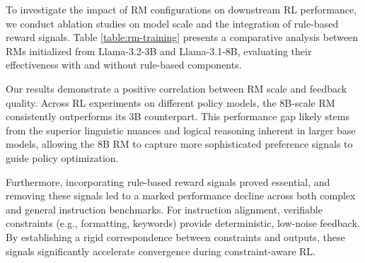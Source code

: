 To investigate the impact of RM configurations on downstream RL performance, we conduct ablation studies on model scale and the integration of rule-based reward signals. Table \ref{table:rm-training} presents a comparative analysis between RMs initialized from Llama-3.2-3B and Llama-3.1-8B, evaluating their effectiveness with and without rule-based components.

Our results demonstrate a positive correlation between RM scale and feedback quality. Across RL experiments on different policy models, the 8B-scale RM consistently outperforms its 3B counterpart. This performance gap likely stems from the superior linguistic nuances and logical reasoning inherent in larger base models, allowing the 8B RM to capture more sophisticated preference signals to guide policy optimization.

Furthermore, incorporating rule-based reward signals proved essential, and removing these signals led to a marked performance decline across both complex and general instruction benchmarks. For instruction alignment, verifiable constraints (e.g., formatting, keywords) provide deterministic, low-noise feedback. By establishing a rigid correspondence between constraints and outputs, these signals significantly accelerate convergence during constraint-aware RL.

